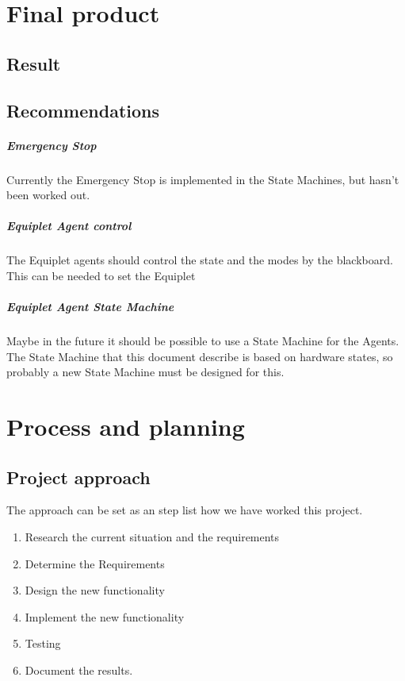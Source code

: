 \documentclass[12pt,a4paper]{report}
\begin{document}






\chapter{Final product}
\section{Result}


\newpage
\section{Recommendations}
\paragraph{Emergency Stop}
Currently the Emergency Stop is implemented in the State Machines, but hasn't been worked out.

\paragraph{Equiplet Agent control}The Equiplet agents should control the state and the modes by the blackboard. This can be needed to set the Equiplet 

\paragraph{Equiplet Agent State Machine}Maybe in the future it should be possible to use a State Machine for the Agents. The State Machine that this document describe is based on hardware states, so probably a new State Machine must be designed for this.

\chapter{Process and planning}
\section{Project  approach}
The approach can be set as an step list how we have worked this project.
\begin{enumerate}
\item Research the current situation and the requirements
\item Determine the Requirements
\item Design the new functionality
\item Implement the new functionality
\item Testing
\item Document the results.
\end{enumerate}
\end{document}
